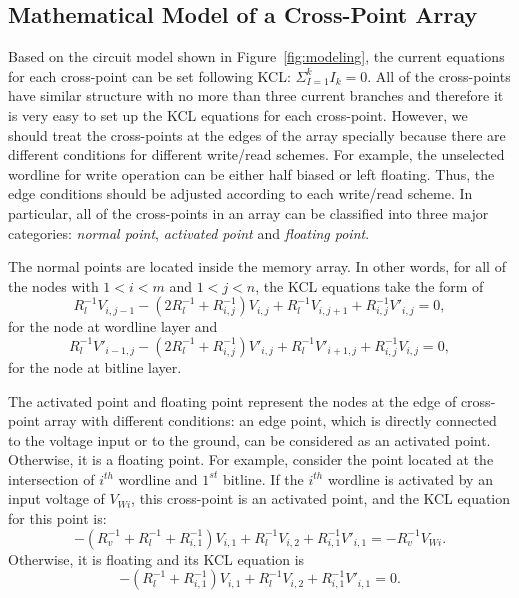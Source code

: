 \subsection{Mathematical Model of a Cross-Point Array}
Based on the circuit model shown in Figure~\ref{fig:modeling}, the current
equations for each cross-point can be set following KCL: $
{\Sigma}_{I=1}^kI_k=0.$ All of the cross-points have similar structure
with no more than three current branches and therefore it is very easy to
set up the KCL equations for each cross-point. However, we should treat
the cross-points at the edges of the array specially because there are
different conditions for different write/read schemes. For example, the
unselected wordline for write operation can be either half biased or left
floating. Thus, the edge conditions should be adjusted according to each
write/read scheme. In particular, all of the cross-points in an array can
be classified into three major categories: \emph{normal point},
\emph{activated point} and \emph{floating point}.

The normal points are located inside the memory array. In other words, for all of the nodes with $1<i<m$ and $1<j<n$, the KCL equations take the form of
\begin{equation}\label{equ:KCL1}
R_l^{-1}V_{i,j-1} -(2R_l^{-1}+R_{i,j}^{-1})V_{i,j}+ R_l^{-1}V_{i,j+1}+R_{i,j}^{-1}V'_{i,j}=0,
\end{equation}
for the node at wordline layer and
\begin{equation}\label{equ:KCL2}
R_l^{-1}V'_{i-1,j} -(2R_l^{-1}+R_{i,j}^{-1})V'_{i,j}+ R_l^{-1}V'_{i+1,j}+R_{i,j}^{-1}V_{i,j}=0,
\end{equation}
for the node at bitline layer.

The activated point and floating point represent the nodes at the edge of cross-point array with different conditions: an edge point, which is directly connected to the voltage input or to the ground, can be considered as an activated point. Otherwise, it is a floating point. For example, consider the point located at the intersection of $i^{th}$ wordline and $1^{st}$ bitline. If the $i^{th}$ wordline is activated by an input voltage of $V_{Wi}$, this cross-point is an activated point, and the KCL equation for this point is:
\begin{equation}\label{equ:KCL3}
-(R_v^{-1}+R_l^{-1}+R_{i,1}^{-1})V_{i,1}+ R_l^{-1}V_{i,2}+R_{i,1}^{-1}V'_{i,1}=-R_v^{-1}V_{Wi}.
\end{equation}
Otherwise, it is floating and its KCL equation is
\begin{equation}\label{equ:KCL4}
-(R_l^{-1}+R_{i,1}^{-1})V_{i,1}+ R_l^{-1}V_{i,2}+R_{i,1}^{-1}V'_{i,1}=0.
\end{equation}

